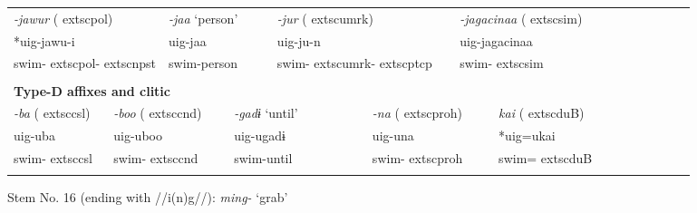\begin{tabularx}{\textwidth}{XXXXXXXXXXXXXXXXXXXX}
\multicolumn{3}{X}{{ \textit{{}-jawur} (	extsc{pol})}} & \multicolumn{2}{X}{{ \textit{{}-jaa} ‘person’}} & \multicolumn{3}{X}{{ \textit{{}-jur} (	extsc{umrk})}} & \multicolumn{4}{X}{{ \textit{{}-jagacinaa} (	extsc{sim})}} & \multicolumn{8}{X}{}\\
\multicolumn{3}{X}{{ *uig-jawu-i}} & \multicolumn{2}{X}{{ uig-jaa}} & \multicolumn{3}{X}{uig-ju-n} & \multicolumn{4}{X}{{ uig-jagacinaa}} & \multicolumn{8}{X}{}\\
\multicolumn{3}{X}{swim-	extsc{pol}-	extsc{npst}} & \multicolumn{2}{X}{swim-person} & \multicolumn{3}{X}{swim-	extsc{umrk}-	extsc{ptcp}} & \multicolumn{4}{X}{swim-	extsc{sim}} & \multicolumn{8}{X}{}\\
\multicolumn{20}{X}{}\\
\multicolumn{20}{X}{{\bfseries Type-D affixes and clitic}}\\
\multicolumn{2}{X}{{ \textit{{}-ba} (	extsc{csl})}} & \multicolumn{2}{X}{{ \textit{{}-boo} (	extsc{cnd})}} & \multicolumn{2}{X}{{ \textit{{}-gadɨ} ‘until’}} & \multicolumn{3}{X}{{ \textit{{}-na} (	extsc{proh})}} & \multicolumn{5}{X}{{ \textit{kai} (	extsc{du}B)}} & \multicolumn{6}{X}{}\\
\multicolumn{2}{X}{{ uig-uba}} & \multicolumn{2}{X}{{ uig-uboo}} & \multicolumn{2}{X}{{ uig-ugadɨ}} & \multicolumn{3}{X}{{ uig-una}} & \multicolumn{5}{X}{{ *uig=ukai}} & \multicolumn{6}{X}{}\\
\multicolumn{2}{X}{swim-	extsc{csl}} & \multicolumn{2}{X}{swim-	extsc{cnd}} & \multicolumn{2}{X}{swim-until} & \multicolumn{3}{X}{swim-	extsc{proh}} & \multicolumn{5}{X}{swim=	extsc{du}B} & \multicolumn{6}{X}{}\\
\lspbottomrule
\end{tabularx}
Stem No. 16 (ending with //i(n)g//): \textit{ming-} ‘grab’

\tablefirsthead{}

